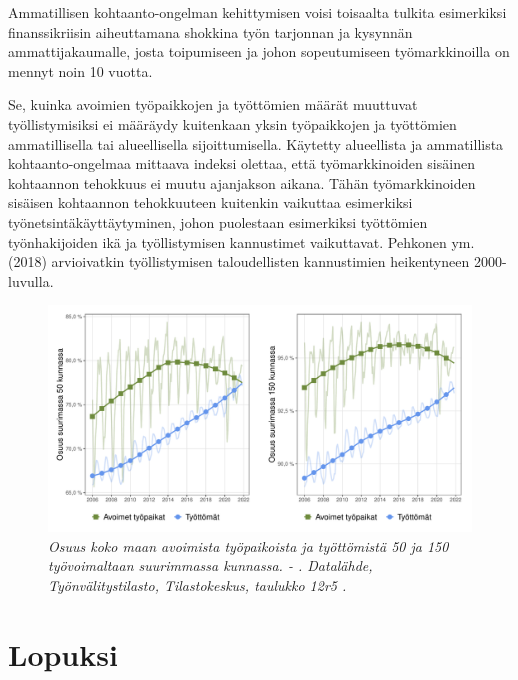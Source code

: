 \documentclass[12pt]{article}
\newcommand{\lastdatamonth}{\unskip}
\newcommand{\firstdatamonth}{\unskip}
\newcommand{\newcaption}[1]{\caption{\textit{\footnotesize{#1}}}}
\begin{document}
Ammatillisen kohtaanto-ongelman kehittymisen voisi toisaalta tulkita esimerkiksi finanssikriisin aiheuttamana shokkina työn tarjonnan ja kysynnän ammattijakaumalle, josta toipumiseen ja johon sopeutumiseen työmarkkinoilla on mennyt noin 10 vuotta.

Se, kuinka avoimien työpaikkojen ja työttömien määrät muuttuvat työllistymisiksi ei määräydy kuitenkaan yksin työpaikkojen ja työttömien ammatillisella tai alueellisella sijoittumisella. Käytetty alueellista ja ammatillista kohtaanto-ongelmaa mittaava indeksi olettaa, että työmarkkinoiden sisäinen kohtaannon tehokkuus ei muutu ajanjakson aikana. Tähän työmarkkinoiden sisäisen kohtaannon tehokkuuteen kuitenkin vaikuttaa esimerkiksi työnetsintäkäyttäytyminen, johon puolestaan esimerkiksi työttömien työnhakijoiden ikä ja työllistymisen kannustimet vaikuttavat. Pehkonen ym. (2018) arvioivatkin työllistymisen taloudellisten kannustimien heikentyneen 2000-luvulla. 

\begin{figure}
\centering
\includegraphics[scale = 0.55]{../kuviot/alueellinen_keskittyminen.pdf}
    \newcaption{Osuus koko maan avoimista työpaikoista ja työttömistä 50 ja 150 työvoimaltaan suurimmassa kunnassa. \protect \firstdatamonth \phantom{}  - \protect\lastdatamonth. Datalähde, Työnvälitystilasto, Tilastokeskus, taulukko 12r5 \protect \cite{svt2011}.}
   \label{fig:mo034}
\end{figure}


\section{Lopuksi}  \label{section:lopuksi}
\end{document}

